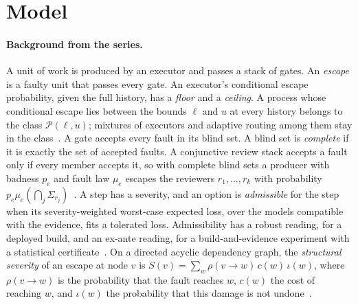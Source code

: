 \documentclass[11pt]{article}
\theoremstyle{definition}
\theoremstyle{remark}
\begin{document}
\section{Model}\label{sec:model}
\paragraph{Background from the series.}
A unit of work is produced by an executor and passes a stack of gates. An \emph{escape} is a faulty
unit that passes every gate. An executor's conditional escape probability, given the full history,
has a \emph{floor} and a \emph{ceiling}. A process whose conditional escape lies between the bounds
$\ell$ and $u$ at every history belongs to the class $\mathcal P(\ell,u)$; mixtures of executors and
adaptive routing among them stay in the class~\cite{p6}. A gate accepts every fault in its blind set.
A blind set is \emph{complete} if it is exactly the set of accepted faults. A conjunctive review stack
accepts a fault only if every member accepts it, so with complete blind sets a producer with badness
$p_e$ and fault law $\mu_e$ escapes the reviewers $r_1,\dots,r_k$ with probability
$p_e\mu_e(\bigcap_j\Sigma_{r_j})$~\cite{p2,p6}. A step has a severity, and an option is
\emph{admissible} for the step when its severity-weighted worst-case expected loss, over the models
compatible with the evidence, fits a tolerated loss. Admissibility has a robust reading, for a
deployed build, and an ex-ante reading, for a build-and-evidence experiment with a statistical
certificate~\cite{p6}. On a directed acyclic dependency graph, the \emph{structural severity} of an
escape at node $v$ is $S(v)=\sum_w\rho(v\to w)\,c(w)\,\iota(w)$, where $\rho(v\to w)$ is the
probability that the fault reaches $w$, $c(w)$ the cost of reaching $w$, and $\iota(w)$ the
probability that this damage is not undone~\cite{p6}.
\end{document}

